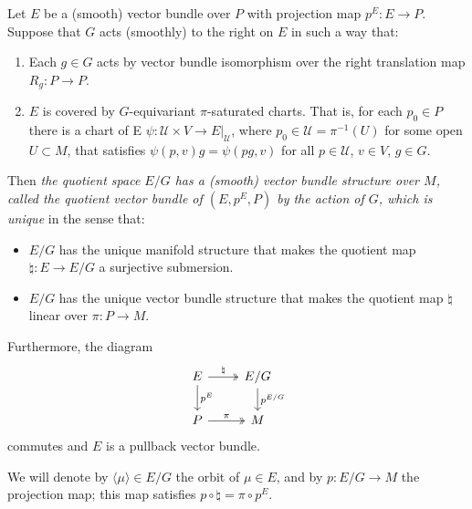 \begin{proposition} \label{3.1.1}
Let $E$ be a (smooth) vector bundle over $P$ with projection map $p^E: E \to P$. Suppose that $G$ acts (smoothly) to the right on $E$ in such a way that:

\begin{enumerate}
    \item Each $g \in G$ acts by vector bundle isomorphism over the right translation map $R_g: P \to P$.
    
    \item $E$ is covered by $G$-equivariant $\pi$-saturated charts. That is, for each $p_0 \in P$ there is a chart of E $\psi: \mathcal U \times V \to E|_{\mathcal U}$, where $p_0 \in \mathcal U = \pi^{-1}(U)$ for some open $U \subset M$, that satisfies $\psi(p, v)g = \psi(pg, v)$ for all $p \in \mathcal U$, $v \in V$, $g \in G$.
\end{enumerate}

Then \emph{the quotient space $E/G$ has a (smooth) vector bundle structure over $M$, called \emph{the quotient vector bundle of $(E, p^E, P)$ by the action of $G$}, which is unique} in the sense that:
\begin{itemize}
    \item $E/G$ has the unique manifold structure that makes the quotient map $\natural: E \to E/G$ a surjective submersion.
    \item $E/G$ has the unique vector bundle structure that makes the quotient map $\natural$ linear over $\pi: P \to M$.
\end{itemize}

Furthermore, the diagram
\begin{equation} \label{pullbackQuotient}
\begin{tikzcd}
    E \arrow[two heads]{r}{\natural} \arrow{d}{p^E} & E/G \arrow{d}{p^{E/G}} \\
    P \arrow[two heads]{r}{\pi}                     & M
\end{tikzcd}
\end{equation}
commutes and $E$ is a pullback vector bundle.

We will denote by $\langle \mu \rangle \in E/G$ the orbit of $\mu \in E$, and by $p:E/G \to M$ the projection map; this map satisfies $p \circ \natural = \pi \circ p^E$.

\end{proposition}

